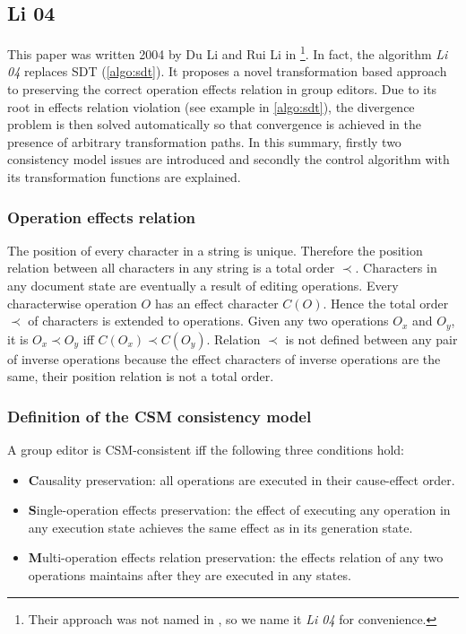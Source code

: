 \subsection{Li 04}
\label{algo:li04}

This paper was written 2004 by Du Li and Rui Li in \cite{li04} \footnote{Their approach was not named in \cite{li04}, so we name it \emph{Li 04} for convenience.}.  In fact, the algorithm \emph{Li 04} replaces SDT (\ref{algo:sdt}). It proposes a novel transformation based approach to preserving the correct operation effects relation in group editors. Due to its root in effects relation violation (see example in \ref{algo:sdt}), the divergence problem is then solved automatically so that convergence is achieved in the presence of arbitrary transformation paths.
In this summary, firstly two consistency model issues are introduced and secondly the control algorithm with its transformation functions are explained.

\subsubsection{Operation effects relation}
The position of every character in a string is unique. Therefore the position relation between all characters in any string is a total order $\prec$. Characters in any document state are eventually a result of editing operations. Every characterwise operation $O$ has an effect character $C(O)$. Hence the total order $\prec$ of characters is extended to operations. Given any two operations $O_{x}$ and $O_{y}$, it is $O_{x} \prec O_{y}$ iff $C(O_{x}) \prec C(O_{y})$. Relation $\prec$ is not defined between any pair of inverse operations because the effect characters of inverse operations are the same, their position relation is not a total order.

\subsubsection{Definition of the CSM consistency model}
A group editor is CSM-consistent iff the following three conditions hold:
\begin{itemize}
 \item \textbf{C}ausality preservation: all operations are executed in their cause-effect order.
 \item \textbf{S}ingle-operation effects preservation: the effect of executing any operation in any execution state achieves the same effect as in its generation state.
 \item \textbf{M}ulti-operation effects relation preservation: the effects relation of any two operations maintains after they are executed in any states.
\end{itemize}

